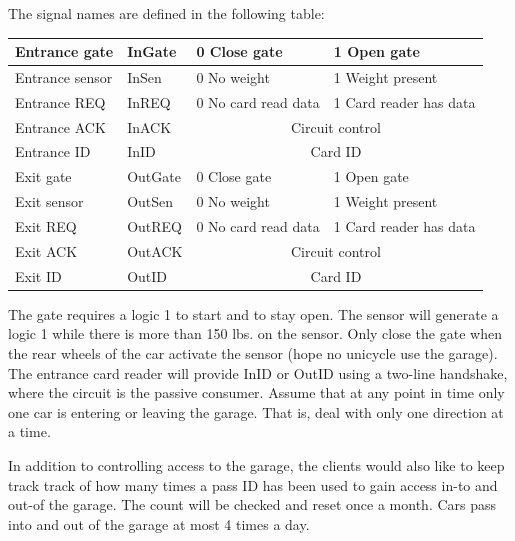 \begin{enumerate}
The signal names are defined in the following table:

\begin{tabular}{|l|l||l|l|} \hline
Entrance gate	& InGate	& 0 Close gate & 1 Open gate \\ \hline
Entrance sensor	& InSen		& 0 No weight &  1 Weight present \\ \hline
Entrance REQ	& InREQ		& 0 No card read data & 1 Card reader has data  \\ \hline
Entrance ACK	& InACK		& \multicolumn{2}{c|}{Circuit control}   \\ \hline
Entrance ID	& InID		& \multicolumn{2}{c|}{Card ID} \\ \hline
Exit gate	& OutGate	& 0 Close gate &  1 Open gate \\ \hline
Exit sensor	& OutSen	& 0 No weight & 1 Weight present\\ \hline
Exit REQ	& OutREQ	& 0 No card read data & 1 Card reader has data  \\ \hline
Exit ACK	& OutACK	& \multicolumn{2}{c|}{Circuit control}   \\ \hline
Exit ID		& OutID		& \multicolumn{2}{c|}{Card ID} \\ \hline
\end{tabular}

The gate requires a logic 1 to start and to stay open. The sensor will 
generate a logic 1 while there is more than 150 lbs. on the sensor.  Only
close the gate when the rear wheels of the car activate the
sensor (hope no unicycle use the garage).  The entrance card reader 
will provide InID or OutID using a 
two-line handshake, where the circuit is the passive consumer.
Assume that at any point in time only one car is
entering or leaving the garage.  That is, deal with only
one direction at a time.

In addition to controlling access to the garage, the clients would also
like to keep track track of how many times a pass ID has been used to
gain access in-to and out-of the garage.  The count will be checked and
reset once a month.  Cars pass into and out of the garage at most 4
times a day.


\end{enumerate}
